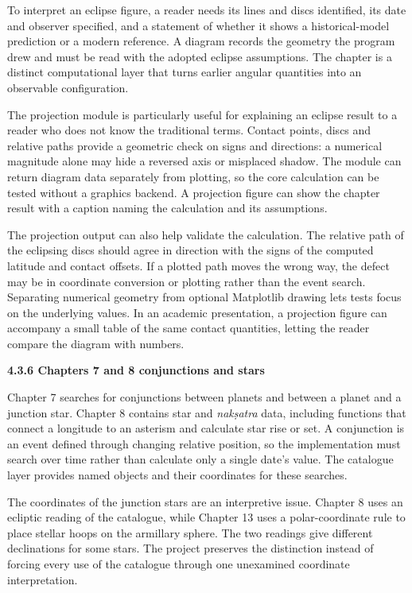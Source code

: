 \documentclass[
]{article}
\begin{document}
To interpret an eclipse figure, a reader needs its lines and discs
identified, its date and observer specified, and a statement of whether
it shows a historical-model prediction or a modern reference. A diagram
records the geometry the program drew and must be read with the adopted
eclipse assumptions. The chapter is a distinct computational layer that
turns earlier angular quantities into an observable configuration.

The projection module is particularly useful for explaining an eclipse
result to a reader who does not know the traditional terms. Contact
points, discs and relative paths provide a geometric check on signs and
directions: a numerical magnitude alone may hide a reversed axis or
misplaced shadow. The module can return diagram data separately from
plotting, so the core calculation can be tested without a graphics
backend. A projection figure can show the chapter result with a caption
naming the calculation and its assumptions.

The projection output can also help validate the calculation. The
relative path of the eclipsing discs should agree in direction with the
signs of the computed latitude and contact offsets. If a plotted path
moves the wrong way, the defect may be in coordinate conversion or
plotting rather than the event search. Separating numerical geometry
from optional Matplotlib drawing lets tests focus on the underlying
values. In an academic presentation, a projection figure can accompany a
small table of the same contact quantities, letting the reader compare
the diagram with numbers.

\textbf{4.3.6 Chapters 7 and 8 conjunctions and stars}

Chapter 7 searches for conjunctions between planets and between a planet
and a junction star. Chapter 8 contains star and \emph{nakṣatra} data,
including functions that connect a longitude to an asterism and
calculate star rise or set. A conjunction is an event defined through
changing relative position, so the implementation must search over time
rather than calculate only a single date's value. The catalogue layer
provides named objects and their coordinates for these searches.

The coordinates of the junction stars are an interpretive issue. Chapter
8 uses an ecliptic reading of the catalogue, while Chapter 13 uses a
polar-coordinate rule to place stellar hoops on the armillary sphere.
The two readings give different declinations for some stars. The project
preserves the distinction instead of forcing every use of the catalogue
through one unexamined coordinate interpretation.
\end{document}
